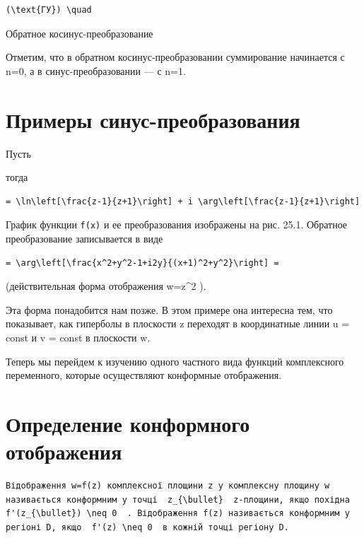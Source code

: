 \documentclass[
  ukrainian,
]{article}
\begin{document}
\begin{verbatim}
(\text{ГУ}) \quad
\end{verbatim}

Обратное косинус-преобразование

Отметим, что в обратном косинус-преобразовании суммирование начинается с
n=0, а в синус-преобразовании --- с n=1.

\section{Примеры
синус-преобразования}\label{ux43fux440ux438ux43cux435ux440ux44b-ux441ux438ux43dux443ux441-ux43fux440ux435ux43eux431ux440ux430ux437ux43eux432ux430ux43dux438ux44f}

Пусть

тогда

\begin{verbatim}
= \ln\left[\frac{z-1}{z+1}\right] + i \arg\left[\frac{z-1}{z+1}\right]
\end{verbatim}

График функции \texttt{f(x)} и ее преобразования изображены на рис.
25.1. Обратное преобразование записывается в виде

\begin{verbatim}
= \arg\left[\frac{x^2+y^2-1+i2y}{(x+1)^2+y^2}\right] =
\end{verbatim}

(действительная форма отображения w=z\^{}2 ).

Эта форма понадобится нам позже. В этом примере она интересна тем, что
показывает, как гиперболы в плоскости z переходят в координатные линии u
= const и v = const в плоскости w.

Теперь мы перейдем к изучению одного частного вида функций комплексного
переменного, которые осуществляют конформные отображения.

\section{Определение конформного
отображения}\label{ux43eux43fux440ux435ux434ux435ux43bux435ux43dux438ux435-ux43aux43eux43dux444ux43eux440ux43cux43dux43eux433ux43e-ux43eux442ux43eux431ux440ux430ux436ux435ux43dux438ux44f}

\begin{verbatim}
Відображення w=f(z) комплексної площини z у комплексну площину w називається конформним у точці  z_{\bullet}  z-площини, якщо похідна  f'(z_{\bullet}) \neq 0  . Відображення f(z) називається конформним у регіоні D, якщо  f'(z) \neq 0  в кожній точці регіону D.
\end{verbatim}
\end{document}
